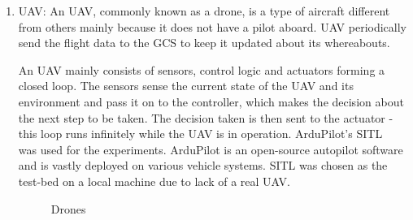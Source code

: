 \begin{enumerate}
\item \acf{UAV}: 
An \ac{UAV}, commonly known as a drone, is a type of aircraft different from others mainly because it does not have a pilot aboard. \ac{UAV} periodically send the flight data to the \ac{GCS} to keep it updated about its whereabouts.
 
An \ac{UAV} mainly consists of sensors, control logic and actuators forming a closed loop. The sensors sense the current state of the \ac{UAV} and its environment and pass it on to the controller, which makes the decision about the next step to be taken. The decision taken is then sent to the actuator - this loop runs infinitely while the \ac{UAV} is in operation. ArduPilot's \acf{SITL} ~\cite{ArdupilotSITL} was used for the experiments. ArduPilot is an open-source autopilot software and is vastly deployed on various vehicle systems. \ac{SITL} was chosen as the test-bed on a local machine due to lack of a real \ac{UAV}.  


\begin{figure}%
    \centering
    \qquad
    \caption{Drones}%
    \label{fig:drone}%
\end{figure}



\end{enumerate}
